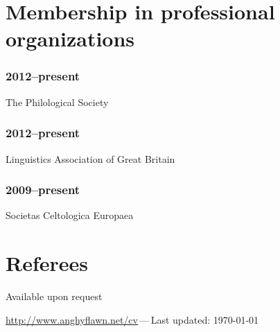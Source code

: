 \documentclass[a4paper,11pt]{article}
\newlength\blockwidth
\newcommand\cvitem[1]{\hspace*{\blockwidth}\begin{minipage}[t]{\linewidth-\blockwidth}
#1
\end{minipage}\par}
\newcommand{\block}[2]{\subsubsection{#1}\cvitem{#2}}
\begin{document}
\section{Membership in professional organizations}
\block{2012--present}{The Philological Society}
\block{2012--present}{Linguistics Association of Great Britain}
\block{2009--present}{Societas Celtologica Europaea}

\section{Referees}

Available upon request

\vfill{}
\hrulefill

\begin{center}
{\footnotesize \href{http://www.anghyflawn.net/cv}{http://www.anghyflawn.net/cv}{\,---\,}Last  updated: \today
}
\end{center}
\end{document}
